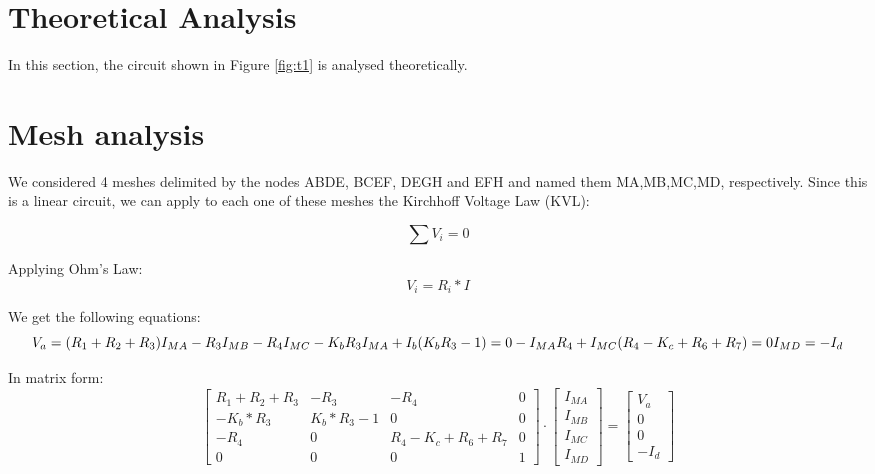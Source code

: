 \section{Theoretical Analysis}
\label{sec:analysis}

In this section, the circuit shown in Figure \ref{fig:t1} is analysed
theoretically.

\section{Mesh analysis}
We considered 4 meshes delimited by the nodes ABDE, BCEF, DEGH and EFH and named them MA,MB,MC,MD, respectively. Since this is a linear circuit, we can apply to each one of these meshes the Kirchhoff Voltage Law (KVL):


\begin{equation}
  \sum V_i = 0
  \label{eq:KVL}
\end{equation}

Applying Ohm's Law:
\begin{equation}
  V_i= R_i * I
  \label{eq:OhmLaw}
\end{equation}

We get the following equations:
\begin{equation}
    
     V_a = (R_1+R_2+R_3)I_{MA} - R_3I_{MB} - R_4I_{MC}\\
  
    -K_bR_3I_{MA} + I_b(K_bR_3-1)=0\\
  
    -I_{MA}R_4 + I_{MC}(R_4-K_c+R_6+R_7)=0\\
   
    I_{MD}= -I_d

  \label{eq:malhas}
\end{equation}

In matrix form:
  \begin{equation}\label{eq:matrixeqn}
\begin{bmatrix}
R_1+R_2+R_3 & -R_3 & -R_4 & 0 \\

-K_b*R_3 & K_b* R_3-1 & 0 & 0 \\

-R_4 & 0 & R_4-K_c+R_6+R_7 & 0 \\

0 & 0 & 0 & 1 
\end{bmatrix}
\cdot
\begin{bmatrix}
I_{MA} \\
I_{MB} \\
I_{MC} \\
I_{MD} 
    \end{bmatrix}
=
    \begin{bmatrix}
V_a \\
0 \\
0 \\
-I_d
    \end{bmatrix}
  \end{equation}

